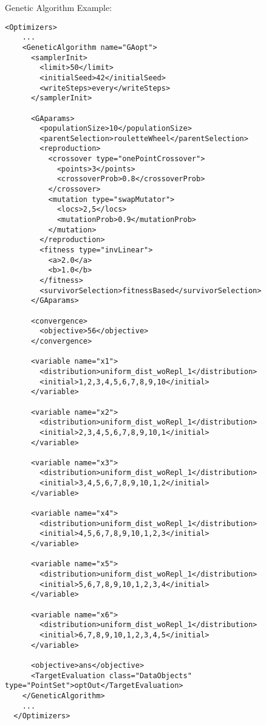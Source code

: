 \hspace{24pt}
Genetic Algorithm Example:
\begin{lstlisting}[style=XML]
  <Optimizers>
    ...
    <GeneticAlgorithm name="GAopt">
      <samplerInit>
        <limit>50</limit>
        <initialSeed>42</initialSeed>
        <writeSteps>every</writeSteps>
      </samplerInit>

      <GAparams>
        <populationSize>10</populationSize>
        <parentSelection>rouletteWheel</parentSelection>
        <reproduction>
          <crossover type="onePointCrossover">
            <points>3</points>
            <crossoverProb>0.8</crossoverProb>
          </crossover>
          <mutation type="swapMutator">
            <locs>2,5</locs>
            <mutationProb>0.9</mutationProb>
          </mutation>
        </reproduction>
        <fitness type="invLinear">
          <a>2.0</a>
          <b>1.0</b>
        </fitness>
        <survivorSelection>fitnessBased</survivorSelection>
      </GAparams>

      <convergence>
        <objective>56</objective>
      </convergence>

      <variable name="x1">
        <distribution>uniform_dist_woRepl_1</distribution>
        <initial>1,2,3,4,5,6,7,8,9,10</initial>
      </variable>

      <variable name="x2">
        <distribution>uniform_dist_woRepl_1</distribution>
        <initial>2,3,4,5,6,7,8,9,10,1</initial>
      </variable>

      <variable name="x3">
        <distribution>uniform_dist_woRepl_1</distribution>
        <initial>3,4,5,6,7,8,9,10,1,2</initial>
      </variable>

      <variable name="x4">
        <distribution>uniform_dist_woRepl_1</distribution>
        <initial>4,5,6,7,8,9,10,1,2,3</initial>
      </variable>

      <variable name="x5">
        <distribution>uniform_dist_woRepl_1</distribution>
        <initial>5,6,7,8,9,10,1,2,3,4</initial>
      </variable>

      <variable name="x6">
        <distribution>uniform_dist_woRepl_1</distribution>
        <initial>6,7,8,9,10,1,2,3,4,5</initial>
      </variable>

      <objective>ans</objective>
      <TargetEvaluation class="DataObjects" type="PointSet">optOut</TargetEvaluation>
    </GeneticAlgorithm>
    ...
  </Optimizers>
\end{lstlisting}

